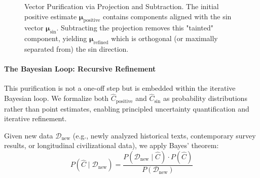 \documentclass[11pt,a4paper]{article}
\theoremstyle{definition}
\theoremstyle{remark}
\begin{document}
\begin{small}
\begin{figure}[h!]
    \caption{Vector Purification via Projection and Subtraction. The initial positive estimate \(\boldsymbol{\mu}_{\text{positive}}\) contains components aligned with the sin vector \(\boldsymbol{\mu}_{\text{sin}}\). Subtracting the projection removes this "tainted" component, yielding \(\boldsymbol{\mu}_{\text{refined}}\) which is orthogonal (or maximally separated from) the sin direction.}
    \label{fig:vector_purification}
\end{figure}

\paragraph{The Bayesian Loop: Recursive Refinement}

This purification is not a one-off step but is embedded within the iterative Bayesian loop. We formalize both \(\hat{C}_{\text{positive}}\) and \(\hat{C}_{\text{sin}}\) as probability distributions rather than point estimates, enabling principled uncertainty quantification and iterative refinement. 

Given new data \(\mathcal{D}_{\text{new}}\) (e.g., newly analyzed historical texts, contemporary survey results, or longitudinal civilizational data), we apply Bayes' theorem:
\begin{equation}
P(\hat{C} \mid \mathcal{D}_{\text{new}}) = \frac{P(\mathcal{D}_{\text{new}} \mid \hat{C}) \cdot P(\hat{C})}{P(\mathcal{D}_{\text{new}})}
\end{equation}


\end{small}
\end{document}
